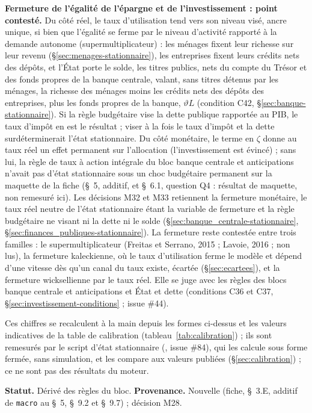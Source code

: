 \documentclass[11pt,a4paper]{article}
\newcommand{\code}[1]{\texttt{\detokenize{#1}}}
\begin{document}
\begin{proposee}
\textbf{Fermeture de l'égalité de l'épargne et de l'investissement : point contesté.} Du côté réel, le taux d'utilisation tend vers son niveau visé, ancre unique, si bien que l'égalité se ferme par le niveau d'activité rapporté à la demande autonome (supermultiplicateur) : les ménages fixent leur richesse sur leur revenu (\S\ref{sec:menages-stationnaire}), les entreprises fixent leurs crédits nets des dépôts, et l'État porte le solde, les titres publics, nets du compte du Trésor et des fonds propres de la banque centrale, valant, sans titres détenus par les ménages, la richesse des ménages moins les crédits nets des dépôts des entreprises, plus les fonds propres de la banque, $\vartheta L$ (condition C42, \S\ref{sec:banque-stationnaire}). Si la règle budgétaire vise la dette publique rapportée au PIB, le taux d'impôt en est le résultat ; viser à la fois le taux d'impôt et la dette surdéterminerait l'état stationnaire. Du côté monétaire, le terme en $\zeta$ donne au taux réel un effet permanent sur l'allocation (l'investissement est évincé) ; sans lui, la règle de taux à action intégrale du bloc banque centrale et anticipations n'avait pas d'état stationnaire sous un choc budgétaire permanent sur la maquette de la fiche (\S~5, additif, et \S~6.1, question Q4 : résultat de maquette, non remesuré ici). Les décisions M32 et M33 retiennent la fermeture monétaire, le taux réel neutre de l'état stationnaire étant la variable de fermeture et la règle budgétaire ne visant ni la dette ni le solde (\S\ref{sec:banque_centrale-stationnaire}, \S\ref{sec:finances_publiques-stationnaire}). La fermeture reste contestée entre trois familles : le supermultiplicateur (Freitas et Serrano, 2015 ; Lavoie, 2016 ; non lus), la fermeture kaleckienne, où le taux d'utilisation ferme le modèle et dépend d'une vitesse dès qu'un canal du taux existe, écartée (\S\ref{sec:ecartees}), et la fermeture wicksellienne par le taux réel. Elle se juge avec les règles des blocs banque centrale et anticipations et État et dette (conditions C36 et C37, \S\ref{sec:investissement-conditions} ; issue \#44).

Ces chiffres se recalculent à la main depuis les formes ci-dessus et les valeurs indicatives de la table de calibration (tableau~\ref{tab:calibration}) ; ils sont remesurés par le script d'état stationnaire (\code{outils/etat_stationnaire.py}, issue \#84), qui les calcule sous forme fermée, sans simulation, et les compare aux valeurs publiées (\S\ref{sec:calibration}) ; ce ne sont pas des résultats du moteur.

\textbf{Statut.} Dérivé des règles du bloc. \textbf{Provenance.} Nouvelle (fiche, \S~3.E, additif de \texttt{macro} au \S~5, \S~9.2 et \S~9.7) ; décision M28.
\end{proposee}
\end{document}
